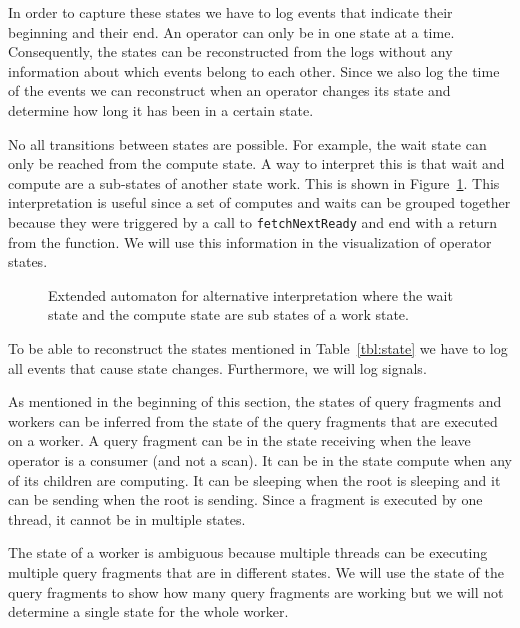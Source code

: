 \documentclass[11pt]{article}
\begin{document}
In order to capture these states we have to log events that indicate their beginning and their end. An operator can only be in one state at a time. Consequently, the states can be reconstructed from the logs without any information about which events belong to each other. Since we also log the time of the events we can reconstruct when an operator changes its state and determine how long it has been in a certain state.

No all transitions between states are possible. For example, the wait state can only be reached from the compute state. A way to interpret this is that wait and compute are a sub-states of another state work. This is shown in Figure~\ref{fig:extd_compute}. This interpretation is useful since a set of computes and waits can be grouped together because they were triggered by a call to \texttt{fetchNextReady} and end with a return from the function. We will use this information in the visualization of operator states.

\begin{figure}[h]
  \begin{center}
    \def\svgwidth{0.35\columnwidth}
    
  \end{center}
  \caption{Extended automaton for alternative interpretation where the wait state and the compute state are sub states of a work state.}
  \label{fig:extd_compute}
\end{figure}

To be able to reconstruct the states mentioned in Table~\ref{tbl:state} we have to log all events that cause state changes. Furthermore, we will log signals. %

As mentioned in the beginning of this section, the states of query fragments and workers can be inferred from the state of the query fragments that are executed on a worker. A query fragment can be in the state receiving when the leave operator is a consumer (and not a scan). It can be in the state compute when any of its children are computing. It can be sleeping when the root is sleeping and it can be sending when the root is sending. Since a fragment is executed by one thread, it cannot be in multiple states.

The state of a worker is ambiguous because multiple threads can be executing multiple query fragments that are in different states. We will use the state of the query fragments to show how many query fragments are working but we will not determine a single state for the whole worker.
\end{document}
